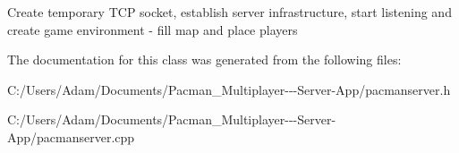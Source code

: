 Create temporary T\+CP socket, establish server infrastructure, start listening and create game environment -\/ fill map and place players 

The documentation for this class was generated from the following files\+:\begin{DoxyCompactItemize}
\item 
C\+:/\+Users/\+Adam/\+Documents/\+Pacman\+\_\+\+Multiplayer-\/-\/-\/\+Server-\/\+App/pacmanserver.\+h\item 
C\+:/\+Users/\+Adam/\+Documents/\+Pacman\+\_\+\+Multiplayer-\/-\/-\/\+Server-\/\+App/pacmanserver.\+cpp\end{DoxyCompactItemize}
